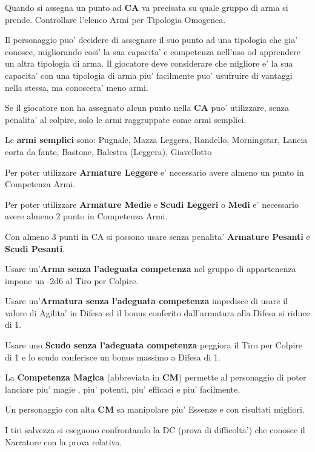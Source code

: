 \documentclass[a4paper,11pt,twoside,openany]{book}
\begin{document}
Quando si assegna un punto ad \textbf{CA} va precisata su quale gruppo di arma si prende. Controllare l'elenco Armi per Tipologia Omogenea.

Il personaggio puo' decidere di assegnare il suo punto ad una tipologia che gia' conosce, migliorando cosi' la sua capacita' e competenza nell'uso od apprendere un altra tipologia di arma. Il giocatore deve considerare che migliore e' la sua capacita' con una tipologia di arma piu' facilmente puo' usufruire di vantaggi nella stessa, ma conoscera' meno armi.

Se il giocatore non ha assegnato alcun punto nella \textbf{CA} puo' utilizzare, senza penalita' al colpire, solo le armi raggruppate come armi semplici.

Le \textbf{armi semplici} sono: Pugnale, Mazza Leggera, Randello, Morningstar,
Lancia corta da fante, Bastone, Balestra (Leggera), Giavellotto

Per poter utilizzare \textbf{Armature Leggere} e' necessario avere almeno un punto in Competenza Armi.

Per poter utilizzare \textbf{Armature Medie} e \textbf{Scudi Leggeri} o \textbf{Medi} e' necessario avere almeno 2 punto in Competenza Armi.

Con almeno 3 punti in CA si possono usare senza penalita' \textbf{Armature Pesanti} e \textbf{Scudi Pesanti}.

Usare un'\textbf{Arma senza l'adeguata competenza} nel gruppo di appartenenza impone un -2d6 al Tiro per Colpire.

Usare un'\textbf{Armatura senza l'adeguata competenza} impedisce di usare il valore di Agilita' in Difesa ed il bonus conferito dall'armatura alla Difesa si riduce di 1.

Usare uno \textbf{Scudo senza l'adeguata competenza} peggiora il Tiro per Colpire di 1 e lo scudo conferisce un bonus massimo a Difesa di 1.

La \textbf{Competenza Magica} (abbreviata in \textbf{CM}) permette al personaggio di poter lanciare piu' magie , piu' potenti, piu' efficaci e piu' facilmente.

Un personaggio con alta \textbf{CM} sa manipolare piu' Essenze e con risultati migliori.

I tiri salvezza si eseguono confrontando la DC (prova di difficolta') che conosce il Narratore con la prova relativa.
\end{document}
